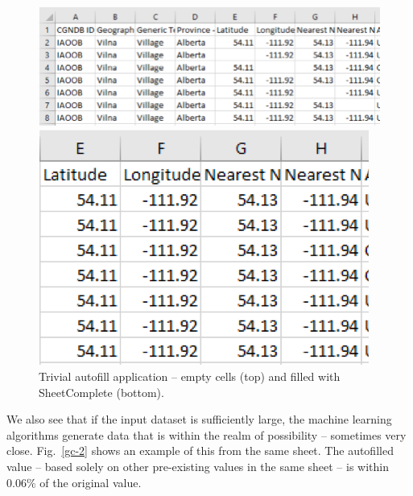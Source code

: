 \documentclass[conference]{IEEEtran}
\begin{document}
\begin{figure}[htbp]
\centerline{\includegraphics[width=\columnwidth]{img/gc-empty1.png}}
\vspace{2mm}
\centerline{\includegraphics[scale=0.7]{img/gc-filled1.png}}
\caption{Trivial autofill application -- empty cells (top) and filled with SheetComplete (bottom).}
\label{gc-1}
\end{figure}

We also see that if the input dataset is sufficiently large, the machine learning algorithms generate data that is within the realm of possibility -- sometimes very close. Fig.~\ref{gc-2} shows an example of this from the same sheet. The autofilled value -- based solely on other pre-existing values in the same sheet -- is within $0.06\%$ of the original value.
\end{document}

